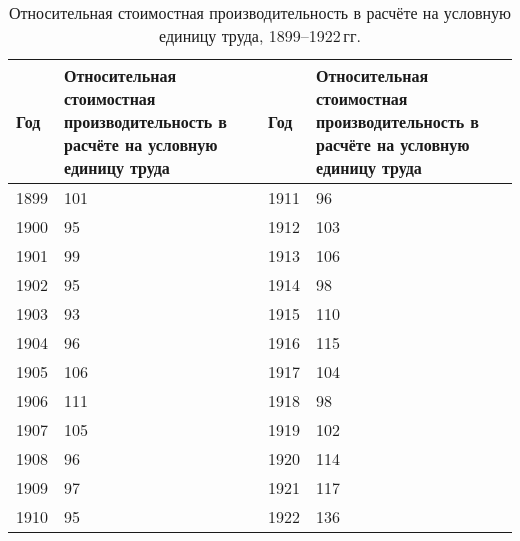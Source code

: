 \documentclass[leqno]{article}  %
\begin{document}
\begin{table}
\centering
\footnotesize{
\caption{Относительная стоимостная производительность в расчёте на условную единицу труда, 1899--1922\,гг.}%
\label{tab10}%
\begin{tabular}{p{}|p{}||p{}|p{}}
\hline
Год & Относительная стоимостная производительность в расчёте на условную единицу труда & Год & Относительная стоимостная производительность в расчёте на условную единицу труда \\
\hline
1899 & \hfill 101 \hspace*{5mm} & 1911 & \hfill 96 \hspace*{5mm} \\
1900 & \hfill 95 \hspace*{5mm} & 1912 & \hfill 103 \hspace*{5mm} \\
1901 & \hfill 99 \hspace*{5mm} & 1913 & \hfill 106 \hspace*{5mm} \\
1902 & \hfill 95 \hspace*{5mm} & 1914 & \hfill 98 \hspace*{5mm} \\
1903 & \hfill 93 \hspace*{5mm} & 1915 & \hfill 110 \hspace*{5mm} \\
1904 & \hfill 96 \hspace*{5mm} & 1916 & \hfill 115 \hspace*{5mm} \\
1905 & \hfill 106 \hspace*{5mm} & 1917 & \hfill 104 \hspace*{5mm} \\
1906 & \hfill 111 \hspace*{5mm} & 1918 & \hfill 98 \hspace*{5mm} \\
1907 & \hfill 105 \hspace*{5mm} & 1919 & \hfill 102 \hspace*{5mm} \\
1908 & \hfill 96 \hspace*{5mm} & 1920 & \hfill 114 \hspace*{5mm} \\
1909 & \hfill 97 \hspace*{5mm} & 1921 & \hfill 117 \hspace*{5mm} \\
1910 & \hfill 95 \hspace*{5mm} & 1922 & \hfill 136 \hspace*{5mm} \\
\hline
\end{tabular}
}
\end{table}
\end{document}
